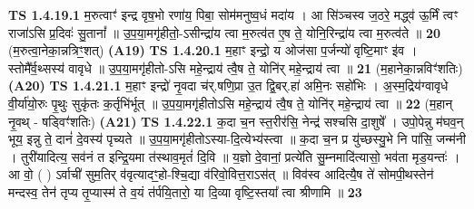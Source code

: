 \documentclass[17pt]{extarticle}
\begin{document}
                                        \textbf{ TS 1.4.19.1} \newline
                  म॒रुत्वाꣳ॑ इन्द्र वृष॒भो रणा॑य॒ पिबा॒ सोम॑मनुष्व॒धं मदा॑य । आ सि॑ञ्चस्व ज॒ठरे॒ मद्ध्व॑ ऊ॒र्मिं त्वꣳ राजा॑ऽसि प्र॒दिवः॑ सु॒तानां᳚ ॥ उ॒प॒या॒मगृ॑हीतो॒-ऽसीन्द्रा॑य त्वा म॒रुत्व॑त ए॒ष ते॒ योनि॒रिन्द्रा॑य त्वा म॒रुत्व॑ते ॥ \textbf{  20} \newline
                  \newline
                      (म॒रुत्वा॒नेका॒न्नत्रिꣳ॒॒शत्)  \textbf{(A19)} \newline \newline
                                        \textbf{ TS 1.4.20.1} \newline
                  म॒हाꣳ इन्द्रो॒ य ओज॑सा प॒र्जन्यो॑ वृष्टि॒माꣳ इ॑व । स्तोमै᳚र्व॒थ्सस्य॑ वावृधे ॥ उ॒प॒या॒मगृ॑हीतो-ऽसि महे॒न्द्राय॑ त्वै॒ष ते॒ योनि॑र् महे॒न्द्राय॑ त्वा ॥ \textbf{  21} \newline
                  \newline
                      (म॒हानेका॒न्नविꣳ॑शतिः)  \textbf{(A20)} \newline \newline
                                        \textbf{ TS 1.4.21.1} \newline
                  म॒हाꣳ इन्द्रो॑ नृ॒वदा च॑र्.षणि॒प्रा उ॒त द्वि॒बर्.हा॑ अमि॒नः सहो॑भिः । अ॒स्म॒द्रिय॑ग्वावृधे वी॒र्या॑यो॒रुः पृ॒थुः सुकृ॑तः क॒र्तृभि॑र्भूत् ॥ उ॒प॒या॒मगृ॑हीतोऽसि महे॒न्द्राय॑ त्वै॒ष ते॒ योनि॑र् महे॒न्द्राय॑ त्वा ॥ \textbf{  22} \newline
                  \newline
                      (म॒हान् नृ॒वथ् - षड्विꣳ॑शतिः)  \textbf{(A21)} \newline \newline
                                        \textbf{ TS 1.4.22.1} \newline
                  क॒दा च॒न स्त॒रीर॑सि॒ नेन्द्र॑ सश्चसि दा॒शुषे᳚ । उपो॒पेन्नु म॑घव॒न् भूय॒ इन्नु ते॒ दानं॑ दे॒वस्य॑ पृच्यते ॥ उ॒प॒या॒मगृ॑हीतोऽस्या-दि॒त्येभ्य॑स्त्वा ॥ क॒दा च॒न प्र यु॑च्छस्यु॒भे नि पा॑सि॒ जन्म॑नी । तुरी॑यादित्य॒ सव॑नं त इन्द्रि॒यमा त॑स्थाव॒मृतं॑ दि॒वि ॥ य॒ज्ञो दे॒वानां॒ प्रत्ये॑ति सु॒म्नमादि॑त्यासो॒ भव॑ता मृड॒यन्तः॑ । आ वो॒ ( ) ऽर्वाची॑ सुम॒तिर् व॑वृत्यादꣳ॒॒हो-श्चि॒द्या व॑रिवो॒वित्त॒राऽस॑त् ॥ विव॑स्व आदित्यै॒ष ते॑ सोमपी॒थस्तेन॑ मन्दस्व॒ तेन॑ तृप्य तृ॒प्यास्म॑ ते व॒यं त॑र्पयि॒तारो॒ या दि॒व्या वृष्टि॒स्तया᳚ त्वा श्रीणामि ॥ \textbf{  23 } \newline
                  \newline
\end{document}
